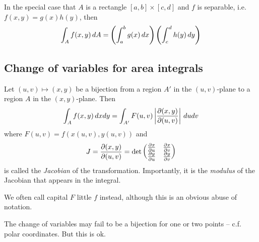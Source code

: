 \documentclass{../template/note}
\begin{document}
    In the special case that \(A\) is a rectangle \([a, b] \times [c, d]\) and \(f\) is separable, i.e. \(f(x, y) = g(x)h(y)\), then
    \begin{align*}
        \int_A f(x, y) \,d{A} = \left(\int_a^b g(x) \,d{x}\right)\left(\int_c^d h(y) \,d{y}\right)
    \end{align*}
    
    \subsection{Change of variables for area integrals}

    \begin{proposition*}
        Let \((u, v) \mapsto (x, y)\) be a bijection from a region \(A'\) in the \((u, v)\)-plane to a region \(A\) in the \((x, y)\)-plane. Then
        \begin{align*}
            \int_A f(x, y) \D x dy = \int_{A'} F(u, v) \left|\pd{(x,y)}{(u, v)}\right| \D u dv \\
        \end{align*}
        where \(F(u, v) = f(x(u, v), y(u, v))\) and
        \begin{align*}
            J = \pd{(x,y)}{(u, v)} = \det \begin{pmatrix}
            \pd x u & \pd x v \\
            \pd y u & \pd y v \\
            \end{pmatrix}
        \end{align*}
        is called the \emph{Jacobian} of the transformation. Importantly, it is the \emph{modulus} of the Jacobian that appears in the integral.
    \end{proposition*}
    
    \begin{remark*}
        We often call capital \(F\) little \(f\) instead, although this is an obvious abuse of notation.
    \end{remark*}

    \begin{remark*}
        The change of variables may fail to be a bijection for one or two points -- c.f. polar coordinates. But this is ok.
    \end{remark*}    
    
\end{document}
